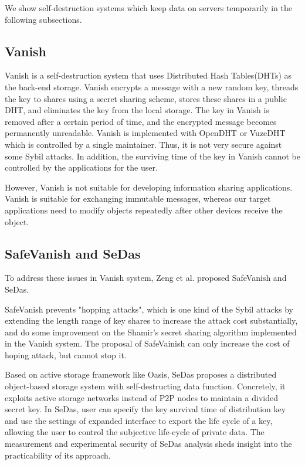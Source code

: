 \documentclass[a4paper,11pt]{report}
\begin{document}
We show self-destruction systems which keep data on servers temporarily in the following subsections.

\subsection{Vanish}

Vanish\cite{geambasu2009vanish} is a self-destruction system that uses Distributed Hash Tables(DHTs) as the back-end storage.
Vanish encrypts a message with a new random key, threads the key to shares using a secret sharing scheme, stores these shares in a public DHT, and eliminates the key from the local storage.
The key in Vanish is removed after a certain period of time, and the encrypted message becomes permanently unreadable.
Vanish is implemented with OpenDHT\cite{rhea2005opendht} or VuzeDHT\cite{vuzedht} which is controlled by a single maintainer. 
Thus, it is not very secure against some Sybil attacks\cite{cholez2009evaluation, wolchok2010defeating}. 
In addition, the surviving time of the key in Vanish cannot be controlled by the applications for the user.

However, Vanish is not suitable for developing information sharing applications. 
Vanish is suitable for exchanging immutable messages, whereas our target applications need to modify objects repeatedly after other devices receive the object.


\subsection{SafeVanish and SeDas}

To address these issues in Vanish system, Zeng et al. proposed SafeVanish\cite{zeng2010safevanish} and SeDas\cite{zeng2012sedas}. 

SafeVanish prevents "hopping attacks"\cite{wolchok2010defeating}, which is one kind of the Sybil attacks\cite{cholez2009evaluation, wolchok2010defeating} by extending the length range of key shares to increase the attack cost substantially, and do some improvement on the Shamir's secret sharing algorithm implemented in the Vanish system.
The proposal of SafeVainish can only increase the cost of hoping attack, but cannot stop it.

Based on active storage framework like Oasis\cite{xie2011design}, SeDas proposes a distributed object-based storage system with self-destructing data function.
Concretely, it exploits active storage networks instead of P2P nodes to maintain a divided secret key. 
In SeDas, user can specify the key survival time of distribution key and use the settings of expanded interface to export the life cycle of a key, allowing the user to control the subjective life-cycle of private data.
The measurement and experimental security of SeDas analysis sheds insight into the practicability of its approach.
\end{document}
